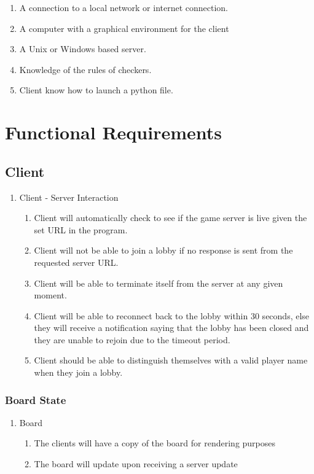 \documentclass[10pt]{article}
\begin{document}
\begin{enumerate}
    \item A connection to a local network or internet connection.
    \item A computer with a graphical environment for the client
    \item A Unix or Windows based server.
    \item Knowledge of the rules of checkers.
    \item Client know how to launch a python file.
\end{enumerate}

\section{Functional Requirements}

\subsection{Client}

\begin{enumerate}[label*=R\arabic*.]
    \item Client - Server Interaction
    \begin{enumerate}[label*=\arabic*.]
        \item Client will automatically check to see if the game server is live given the set URL in the program.
        \item Client will not be able to join a lobby if no response is sent from the requested server URL.
        \item Client will be able to terminate itself from the server at any given moment.
        \item Client will be able to reconnect back to the lobby within 30 seconds, else they will receive a notification saying that the lobby has been closed and they are unable to rejoin due to the timeout period.
        \item Client should be able to distinguish themselves with a valid player name when they join a lobby.
    \end{enumerate}
\end{enumerate}

\subsubsection{Board State}

\begin{enumerate}[resume*]
    \item Board
    \begin{enumerate}[label*=\arabic*.]
        \item The clients will have a copy of the board for rendering purposes
        \item The board will update upon receiving a server update
    \end{enumerate}
\end{enumerate}
\end{document}
